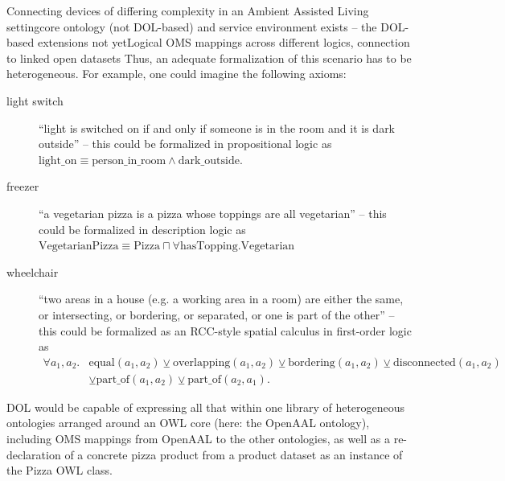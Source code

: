 \documentclass[10pt,fleqn,%
\ifpretendfinal
final%
\else
draft%
\fi,
]{scrreprt}
\makeatletter
\newcommand*{\eg}{e.g.\@\xspace}
\makeatother
\begin{document}
\begin{usecase}{Connecting devices of differing complexity in an Ambient Assisted Living setting}{core ontology (not DOL-based) and service environment exists – the DOL-based extensions not yet}{Logical OMS mappings across different logics, connection to linked open datasets}
  Thus, an adequate formalization of this scenario has to be heterogeneous.  For example, one could imagine the following axioms:
  \begin{description}
  \item[light switch] ``light is switched on if and only if someone is in the room and it is dark outside'' – this could be formalized in propositional logic as $\mathrm{light\_on}\equiv\mathrm{person\_in\_room}\wedge\mathrm{dark\_outside}$.
  \item[freezer] ``a vegetarian pizza is a pizza whose toppings are all vegetarian'' – this could be formalized in description logic as $\mathrm{VegetarianPizza}\equiv\mathrm{Pizza}\sqcap \forall \mathrm{hasTopping}.\mathrm{Vegetarian}$
  \item[wheelchair] ``two areas in a house (\eg a working area in a room) are either the same, or intersecting, or bordering, or separated, or one is part of the other'' – this could be formalized as an RCC-style spatial calculus in first-order logic as $$\begin{array}{ll}\forall a_1, a_2 . & \mathrm{equal}(a_1, a_2) \veebar \mathrm{overlapping}(a_1, a_2) \veebar \mathrm{bordering}(a_1, a_2) \veebar \mathrm{disconnected}(a_1, a_2) \\
&\veebar \mathrm{part\_of}(a_1, a_2) \veebar \mathrm{part\_of}(a_2, a_1).\end{array}$$
  \end{description}
  
  DOL would be capable of expressing all that within one library of heterogeneous ontologies arranged around an OWL core (here: the OpenAAL ontology), including OMS mappings from OpenAAL to the other ontologies, as well as a re-declaration of a concrete pizza product from a product dataset as an instance of the Pizza OWL class.
\end{usecase}
\end{document}
